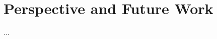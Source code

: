 \documentclass[twoside,twocolumn,9pt]{article}
\begin{document}

\newpage



\section*{Perspective and Future Work}
    
... \\
\end{document}
